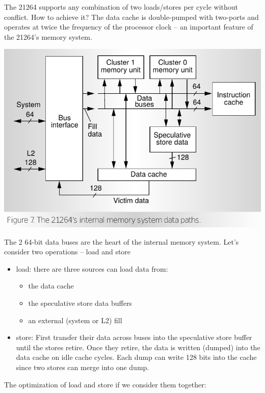 \documentclass[11pt]{article}
\begin{document}
\begin{itemize}
\begin{enumerate}
		The 21264 supports any combination of two loads/stores per cycle without conflict. How to achieve it? The data cache is double-pumped with two-ports and operates at twice the frequency of the processor clock -- an important feature of the 21264's memory system.
		\begin{center}
			\includegraphics[scale=0.35]{dataPath.png}
		\end{center}
		The 2 64-bit data buses are the heart of the internal memory system. Let's consider two operations -- load and store
		\begin{itemize}
			\item load: there are three sources can load data from: \begin{itemize}
				\item the data cache
				\item the speculative store data buffers
				\item an external (system or L2) fill
			\end{itemize}
			\item store: First transfer their data across buses into the speculative store buffer until the stores retire. Once they retire, the data is written (dumped) into the data cache on idle cache cycles. Each dump can write 128 bits into the cache since two stores can merge into one dump.
		\end{itemize}
		The optimization of load and store if we consider them together:
		

\end{enumerate}
\end{itemize}
\end{document}
